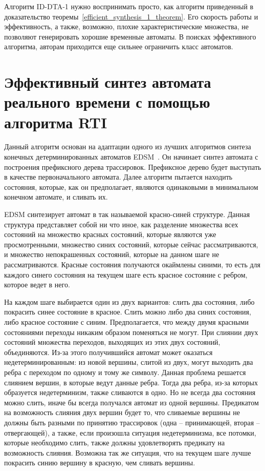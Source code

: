 \documentclass[times,specification,annotation]{itmo-student-thesis}
\begin{document}
Алгоритм ID-DTA-1 нужно воспринимать просто, как алгоритм приведенный в доказательство теоремы~\ref{efficient_synthesis_1_theorem}. Его скорость работы и эффективность, а также, возможно,
плохие характеристические множества, не позволяют генерировать хорошие временные автоматы. В поисках эффективного алгоритма, авторам приходится еще сильнее ограничить класс автоматов.

\section{Эффективный синтез автомата реального времени с помощью алгоритма RTI}

Данный алгоритм основан на адаптации одного из лучших алгоритмов синтеза конечных детерминированных автоматов EDSM~\cite{state-merging-dfa}. 
Он начинает синтез автомата с построения префиксного дерева трассировок. Префиксное дерево будет выступать в качестве первоначального автомата.
Далее алгоритм пытается находить состояния, которые, как он предполагает, являются одинаковыми в минимальном конечном автомате, и сливать их.

EDSM синтезирует автомат в так называемой красно-синей структуре. Данная структура представляет собой ни что иное, как разделение множества всех состояний на
множество красных состояний, которые являются уже просмотренными, множество синих состояний, которые сейчас рассматриваются, и множество непокрашенных
состояний, которые на данном шаге не рассматриваются. Красные состояния получаются окаймлены синими, то есть
для каждого синего состояния на текущем шаге есть красное состояние с ребром, которое ведет в него.

На каждом шаге выбирается один из двух вариантов: слить два состояния, либо покрасить синее состояние в красное. Слить можно либо два синих состояния,
либо красное состояние с синим. Предполагается, что между двумя красными состояниями переходы никаким образом поменяться не могут. При слиянии двух состояний 
множества переходов, выходящих из этих двух состояний, объединяются. Из-за этого получившийся автомат может оказаться недетерминированным: из новой вершины,
слитой из двух, могут выходить два ребра с переходом по одному и тому же символу. Данная проблема решается слиянием вершин, в которые ведут данные ребра. Тогда
два ребра, из-за которых образуется недетерминизм, также сливаются в одно. Но не всегда два состояния можно слить, иначе бы всегда получался автомат из одной вершины.
Предикатом на возможность слияния двух вершин будет то, что сливаемые вершины не должны быть разными по принятию трассировок (одна -- принимающей, вторая -- отвергающей), а также, 
если произошла ситуация недетерминизма, все потомки, которые необходимо слить, также должны удовлетворять предикату на возможность слияния.
Возможна так же ситуация, что на текущем шаге лучше покрасить синию вершину в красную, чем сливать вершины.
\end{document}
